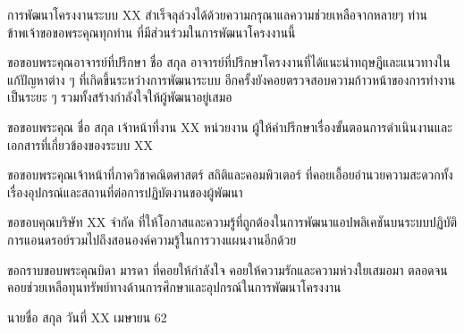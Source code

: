 \begin{acknowledgements} %
	การพัฒนาโครงงานระบบ XX สำเร็จลุล่วงได้ด้วยความกรุณาแลความช่วยเหลือจากหลายๆ ท่าน ข้าพเจ้าขอขอพระคุณทุกท่าน ที่มีส่วนร่วมในการพัฒนาโครงงานนี้
	
    ขอขอบพระคุณอาจารย์ที่ปรึกษา ชื่อ สกุล  อาจารย์ที่ปรึกษาโครงงานที่ได้แนะนำทฤษฎีและแนวทางในแก้ปัญหาต่าง ๆ  ที่เกิดขึ้นระหว่างการพัฒนาระบบ อีกครั้งยังคอยตรวจสอบความก้าวหน้าของการทำงานเป็นระยะ ๆ รวมทั้งสร้างกำลังใจให้ผู้พัฒนาอยู่เสมอ

    ขอขอบพระคุณ ชื่อ สกุล เจ้าหน้าที่งาน XX หน่วยงาน ผู้ให้คำปรึกษาเรื่องขั้นตอนการดำเนินงานและเอกสารที่เกี่ยวข้องของระบบ XX 
    
   ขอขอบพระคุณเจ้าหน้าที่ภาควิชาคณิตศาสตร์ สถิติและคอมพิวเตอร์ ที่คอยเอื้อยอำนวยความสะดวกทั้งเรื่องอุปกรณ์และสถานที่ต่อการปฏิบัตงานของผู้พัฒนา
   
  ขอขอบคุณบริษัท XX จำกัด ที่ให้โอกาสและความรู้ที่ถูกต้องในการพัฒนาแอปพลิเคชันบนระบบปฏิบัติการแอนดรอย์รวมไปถึงสอนองค์ความรู้ในการวางแผนงานอีกด้วย
  
  ขอกราบขอบพระคุณบิดา มารดา ที่คอยให้กำลังใจ คอยให้ความรักและความห่วงใยเสมอมา
  ตลอดจนคอยช่วยเหลือทุนทรัพย์ทางด้านการศึกษาและอุปกรณ์ในการพัฒนาโครงงาน
    
\end{acknowledgements}

\begin{flushright}
    นายชื่อ สกุล
    \vspace{-5mm}
    วันที่ XX เมษายน 62
\end{flushright}
